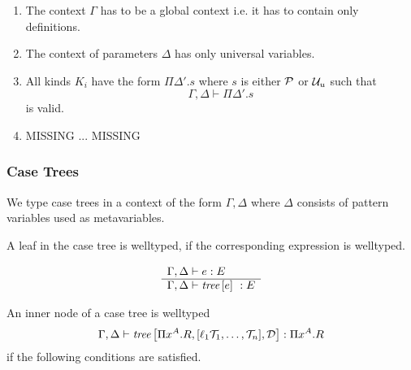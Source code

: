 \begin{enumerate}

    \item The context $\Gamma$ has to be a global context i.e. it has to contain
        only definitions.

    \item The context of parameters $\Delta$ has only universal variables.

    \item All kinds $K_i$ have the form $\Pi \Delta'. s$ where $s$ is either
        ${\mathcal P}$ or ${\mathcal U}_u$ such that
        $$
            \Gamma, \Delta \vdash \Pi \Delta'. s
        $$
        is valid.

    \item MISSING ... MISSING
\end{enumerate}






\subsubsection{Case Trees}

We type case trees in a context of the form $\Gamma, \Delta$ where $\Delta$
consists of pattern variables used as metavariables.

A leaf in the case tree is welltyped, if the corresponding expression is
welltyped.

$$
\rulev{
    \Gamma, \Delta \vdash e : E
}
{
    \Gamma, \Delta \vdash \ctreebr{ e } : E
}
$$



An inner node of a case tree is welltyped
$$
    \Gamma, \Delta
    \vdash
    {{\text{\it tree}}\left[ {
        \Pi x^A. R,
        [\ell_1 {\mathcal T}_1, \ldots, {\mathcal T}_n],
        {\mathcal D}
    } \right]}
    : \Pi x^A. R
$$
if the following conditions are satisfied.

